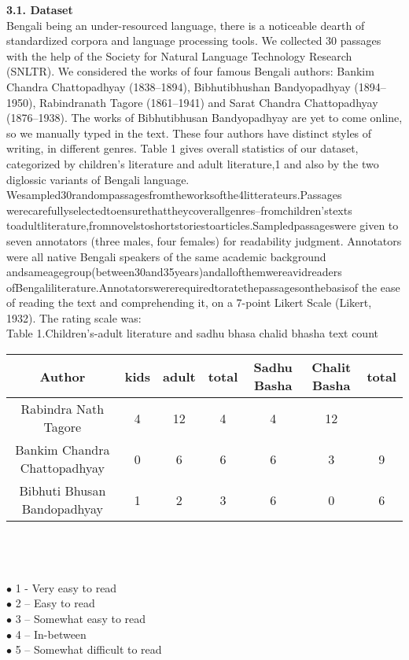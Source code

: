 \documentclass[9pt]{article}
\begin{document}
\huge{\textbf{3.1. Dataset}}\\
Bengali being an under-resourced language, there is a noticeable dearth of standardized corpora and language processing tools. We collected 30 passages with the help of the Society for Natural Language Technology Research (SNLTR). We considered the works of four famous Bengali authors: Bankim Chandra Chattopadhyay (1838–1894), Bibhutibhushan Bandyopadhyay (1894–1950), Rabindranath Tagore (1861–1941) and Sarat Chandra Chattopadhyay (1876–1938). The works of Bibhutibhusan Bandyopadhyay are yet to come online, so we manually typed in the text. These four authors have distinct styles of writing, in diﬀerent genres. Table 1 gives overall statistics of our dataset, categorized by children’s literature and adult literature,1 and also by the two diglossic variants of Bengali language.\\
Wesampled30randompassagesfromtheworksofthe4litterateurs.Passages werecarefullyselectedtoensurethattheycoverallgenres–fromchildren’stexts toadultliterature,fromnovelstoshortstoriestoarticles.Sampledpassageswere given to seven annotators (three males, four females) for readability judgment. Annotators were all native Bengali speakers of the same academic background andsameagegroup(between30and35years)andallofthemwereavidreaders ofBengaliliterature.Annotatorswererequiredtoratethepassagesonthebasisof the ease of reading the text and comprehending it, on a 7-point Likert Scale (Likert, 1932). The rating scale was:\cite{jaman}
\\


Table 1.Children's-adult literature and sadhu bhasa chalid bhasha text count\\
\begin{tabular}{c c c c c c c}
\hline
Author&\hspace{.2cm}kids &adult&\hspace{.2cm}total &\hspace{.2cm}Sadhu Basha&Chalit Basha &total\\
\hline
Rabindra Nath Tagore&4&12&4&4&12\\
Bankim Chandra Chattopadhyay&0&6&6&6&3&9\\
Bibhuti Bhusan Bandopadhyay&1&2&3&6&0&6\\
\hline


\end{tabular}
\\
\\
\\
$\bullet$ 1 - Very easy to read\\
$\bullet$ 2 – Easy to read \\
$\bullet$ 3 – Somewhat easy to read\\
$\bullet$ 4 – In-between\\
$\bullet$ 5 – Somewhat diﬃcult to read\\
\end{document}
